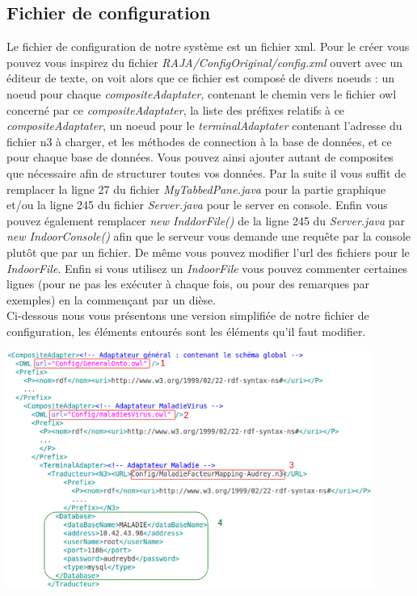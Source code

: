 \documentclass[12pt]{article}
\begin{document}
	\subsection{Fichier de configuration}
	Le fichier de configuration de notre système est un fichier xml. Pour le créer vous pouvez vous inspirez du fichier \textit{RAJA/ConfigOriginal/config.xml} ouvert avec un éditeur de texte, on voit alors que ce fichier est composé de divers noeuds : un noeud pour chaque \textit{compositeAdaptater}, contenant le chemin vers le fichier owl concerné par ce \textit{compositeAdaptater}, la liste des préfixes relatifs à ce \textit{compositeAdaptater}, un noeud pour le \textit{terminalAdaptater} contenant l'adresse du fichier n3 à charger, et les méthodes de connection à la base de données, et ce pour chaque base de données. Vous pouvez ainsi ajouter autant de composites que nécessaire afin de structurer toutes vos données. Par la suite il vous suffit de remplacer la ligne 27 du fichier \textit{MyTabbedPane.java} pour la partie graphique et/ou la ligne 245 du fichier \textit{Server.java} pour le server en console. Enfin vous pouvez également remplacer \textit{new InddorFile()} de la ligne 245 du \textit{Server.java} par \textit{new IndoorConsole()} afin que le serveur vous demande une requête par la console plutôt que par un fichier. De même vous pouvez modifier l'url des fichiers pour le \textit{IndoorFile}. Enfin si vous utilisez un \textit{IndoorFile} vous pouvez commenter certaines lignes (pour ne pas les exécuter à chaque fois, ou pour des remarques par exemples) en la commençant par un dièse.\\
	\indent Ci-dessous nous vous présentons une version simplifiée de notre fichier de configuration, les éléments entourés sont les éléments qu'il faut modifier.
	\begin{center}
	\includegraphics[width=0.90\textwidth]{Image/config.png}
\end{center}
\end{document}
